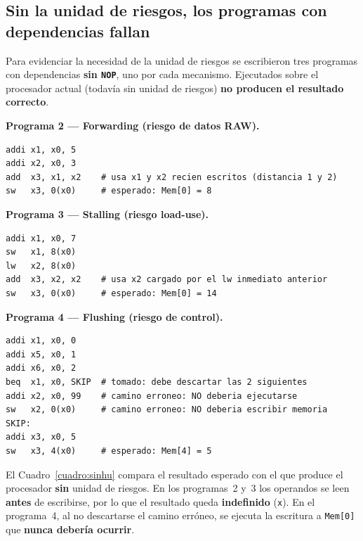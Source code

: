 \documentclass[11pt,a4paper]{article}
\begin{document}
\subsection{Sin la unidad de riesgos, los programas con dependencias fallan}

Para evidenciar la necesidad de la unidad de riesgos se escribieron tres programas con
dependencias \textbf{sin \texttt{NOP}}, uno por cada mecanismo. Ejecutados sobre el
procesador actual (todavía sin unidad de riesgos) \textbf{no producen el resultado
	correcto}.

\noindent\begin{minipage}{\linewidth}
	\textbf{Programa 2 --- Forwarding (riesgo de datos RAW).}

	\begin{lstlisting}[language={}]
addi x1, x0, 5
addi x2, x0, 3
add  x3, x1, x2    # usa x1 y x2 recien escritos (distancia 1 y 2)
sw   x3, 0(x0)     # esperado: Mem[0] = 8
\end{lstlisting}
\end{minipage}
\medskip

\noindent\begin{minipage}{\linewidth}
	\textbf{Programa 3 --- Stalling (riesgo load-use).}

	\begin{lstlisting}[language={}]
addi x1, x0, 7
sw   x1, 8(x0)
lw   x2, 8(x0)
add  x3, x2, x2    # usa x2 cargado por el lw inmediato anterior
sw   x3, 0(x0)     # esperado: Mem[0] = 14
\end{lstlisting}
\end{minipage}
\medskip

\noindent\begin{minipage}{\linewidth}
	\textbf{Programa 4 --- Flushing (riesgo de control).}

	\begin{lstlisting}[language={}]
addi x1, x0, 0
addi x5, x0, 1
addi x6, x0, 2
beq  x1, x0, SKIP  # tomado: debe descartar las 2 siguientes
addi x2, x0, 99    # camino erroneo: NO deberia ejecutarse
sw   x2, 0(x0)     # camino erroneo: NO deberia escribir memoria
SKIP:
addi x3, x0, 5
sw   x3, 4(x0)     # esperado: Mem[4] = 5
\end{lstlisting}
\end{minipage}
\medskip

El Cuadro~\ref{cuadro:sinhu} compara el resultado esperado con el que produce el
procesador \textbf{sin} unidad de riesgos. En los programas~2 y~3 los operandos se leen
\textbf{antes} de escribirse, por lo que el resultado queda \textbf{indefinido}
(\texttt{x}). En el programa~4, al no descartarse el camino erróneo, se ejecuta la
escritura a \texttt{Mem[0]} que \textbf{nunca debería ocurrir}.
\end{document}
